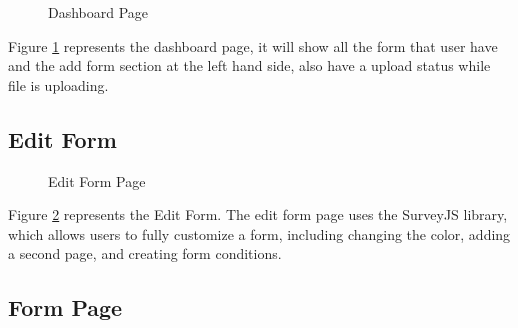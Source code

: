 \documentclass[12pt,oneside,openright,a4paper]{cpe-english-project}
\begin{document}
\begin{figure}[!h]
\centering
{}
\caption{Dashboard Page}\label{fig:Dashboard}
\end{figure}

Figure \ref{fig:Dashboard} represents the dashboard page, it will show all the form that user have and the add form section at the left hand side, also have a upload status while file is uploading.

\newpage
\subsection{Edit Form}

\begin{figure}[!h]
\centering
{}
\caption{Edit Form Page}\label{fig:edit-form}
\end{figure}

Figure \ref{fig:edit-form}  represents the Edit Form. The edit form page uses the SurveyJS library, which allows users to fully customize a form, including changing the color, adding a second page, and creating form conditions.

\subsection{Form Page}
\end{document}
